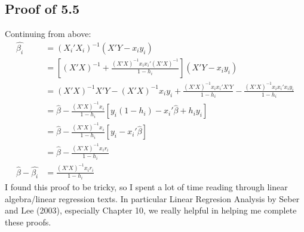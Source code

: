 \documentclass{article}\usepackage[]{graphicx}\usepackage[]{color}
\begin{document}
\subsection*{Proof of 5.5}
Continuing from above:
\begin{align*}
\hat{\beta_i} &= (X_i' X_i)^{-1}(X'Y - x_i y_i)\\
&= \left[(X'X)^{-1} + \frac{(X' X)^{-1} x_i x_i' (X' X)^{-1}}{1 - h_i}\right](X'Y - x_i y_i)\\
&= (X' X)^{-1} X' Y - (X' X)^{-1} x_i y_i + \frac{(X' X)^{-1} x_i x_i' X' Y}{1 - h_i} - \frac{(X' X)^{-1} x_i x_i' x_i y_i}{1 - h_i}\\
&= \hat{\beta} - \frac{(X' X)^{-1} x_i}{1 - h_i}\left[y_i(1 - h_i) - x_i' \hat{\beta} + h_i y_i \right]\\
&= \hat{\beta} - \frac{(X' X)^{-1} x_i}{1 - h_i}\left[y_i - x_i' \hat{\beta}\right]\\
&= \hat{\beta} - \frac{(X' X)^{-1} x_i r_i}{1 - h_i}\\
\hat{\beta} - \hat{\beta_i} &= \frac{(X' X)^{-1} x_i r_i}{1 - h_i}
\end{align*}
I found this proof to be tricky, so I spent a lot of time reading through linear
algebra/linear regression texts.  In particular Linear Regresion Analysis by Seber and Lee (2003), especially Chapter 10, we really helpful in helping me complete these proofs.
\end{document}
